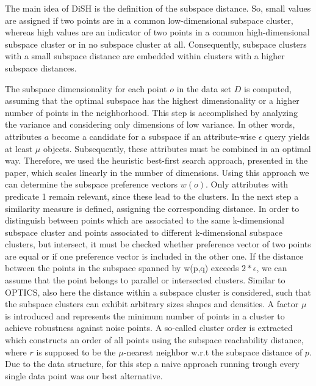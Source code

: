 \documentclass{article}
\begin{document}
The main idea of DiSH is the definition of the subspace distance. So, small values are assigned if two points are in a common low-dimensional subspace cluster, whereas high values are an indicator of two points in a common high-dimensional subspace cluster or in no subspace cluster at all. Consequently, subspace clusters with a small subspace distance are embedded within clusters with a higher subspace distances.\par

The subspace dimensionality for each point $o$ in the data set $D$ is computed, assuming that the optimal subspace has the highest dimensionality or a higher number of points in the neighborhood. This step is accomplished by analyzing the variance and considering only dimensions of low variance.  In other words, attributes $a$ become a candidate for a subspace if an attribute-wise $\epsilon$ query yields at least $\mu$ objects. Subsequently, these attributes must be combined in an optimal way. Therefore, we used the heuristic best-first search approach, presented in the paper, which scales linearly in the number of dimensions. Using this approach we can determine the subspace preference vectors $w(o)$. Only attributes with predicate 1 remain relevant, since these lead to the clusters. In the next step a similarity measure is defined, assigning the corresponding distance. In order to distinguish between points which are associated to the same k-dimensional subspace cluster and points associated to different k-dimensional subspace clusters, but intersect, it must be checked whether preference vector of two points are equal or if one preference vector is included in the other one. If the distance between the points in the subspace spanned by w(p,q) exceeds $2*\epsilon$, we can assume that the point belongs to parallel or intersected clusters. Similar to OPTICS, also here the distance within a subspace cluster is considered, such that the subspace clusters can exhibit arbitrary sizes shapes and densities. A factor $\mu$ is introduced and represents the minimum number of points in a cluster to achieve robustness against noise points. A so-called cluster order is extracted which constructs an order of all points using the subspace reachability distance, where $r$ is supposed to be the $\mu$-nearest neighbor w.r.t the subspace distance of $p$. Due to the data structure, for this step a naive approach running trough every single data point was our best alternative.\par  

\end{document}
